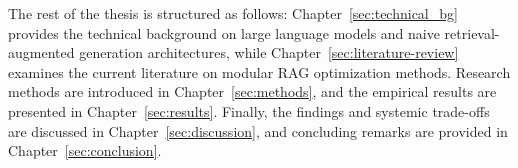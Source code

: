 The rest of the thesis is structured as follows: Chapter~\ref{sec:technical_bg} provides the technical background on large language models and naive retrieval-augmented generation architectures, while Chapter~\ref{sec:literature-review} examines the current literature on modular RAG optimization methods. Research methods are introduced in Chapter~\ref{sec:methods}, and the empirical results are presented in Chapter~\ref{sec:results}. Finally, the findings and systemic trade-offs are discussed in Chapter~\ref{sec:discussion}, and concluding remarks are provided in Chapter~\ref{sec:conclusion}.
